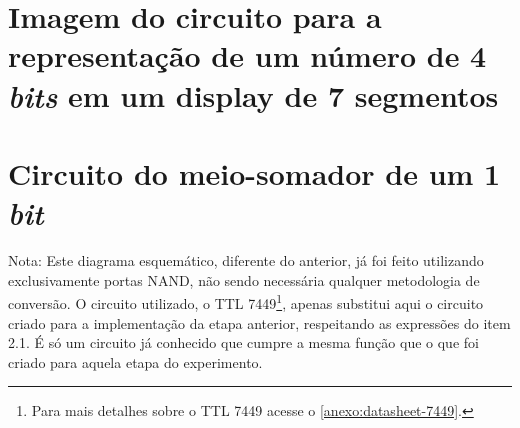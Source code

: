 
\begin{apendicesenv}

\partapendices

\chapter{Imagem do circuito para a representação de um número de 4 \textit{bits} em um display de 7 segmentos}
	\label{apendice:CircuitoEtapa1}
	

	\chapter{Circuito do meio-somador de um 1 \textit{bit}}
		\label{apendice:CircuitoEtapa2}
		

		Nota: Este diagrama esquemático, diferente do anterior, já foi feito
		utilizando exclusivamente portas NAND, não sendo necessária qualquer metodologia de conversão.
		O circuito utilizado, o TTL 7449\footnote{Para mais detalhes sobre o TTL 7449 acesse o \autoref{anexo:datasheet-7449}.}, apenas substitui aqui o circuito criado para a implementação
		da etapa anterior, respeitando as expressões do item 2.1. É só um circuito já conhecido que
		cumpre a mesma função que o que foi criado para aquela etapa do experimento.




\end{apendicesenv}

